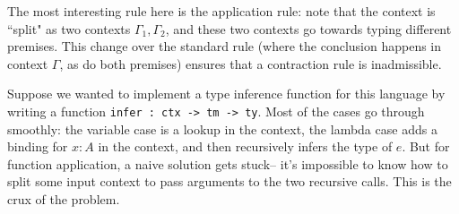 \documentclass{article}
\theoremstyle{definition}
\begin{document}
The most interesting rule here is the application rule: note that the context is ``split" as two contexts $\Gamma_1,\Gamma_2$, and these two  contexts go towards typing different premises. This change over the standard rule (where the conclusion happens in context $\Gamma$, as do both premises) ensures that a contraction rule is inadmissible. 

Suppose we wanted to implement a type inference function for this language by writing a function \texttt{infer : ctx -> tm -> ty}. Most of the cases go through smoothly: the variable case is a lookup in the context, the lambda case adds a binding for $x : A$ in the context, and then recursively infers the type of $e$. But for function application, a naive solution gets stuck-- it's impossible to know how to split some input context to pass arguments to the two recursive calls. This is the crux of the problem.
\end{document}
